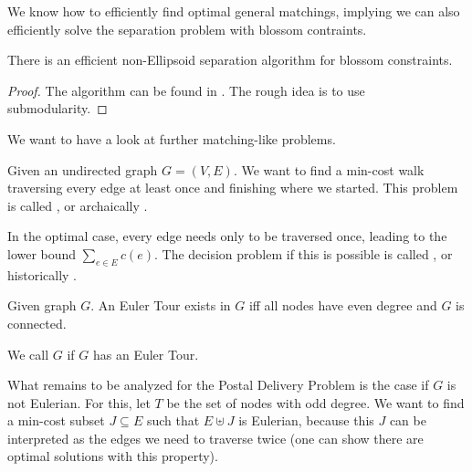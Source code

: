 
We know how to efficiently find optimal general matchings, implying we can also efficiently solve the separation problem
with blossom contraints.
\begin{theorem}
    There is an efficient non-Ellipsoid separation algorithm for blossom constraints.
\end{theorem}
\begin{proof}
    The algorithm can be found in \cite[Ch.~6.8]{comb-optimization-cook}. The rough idea is to use submodularity.
\end{proof}
We want to have a look at further matching-like problems.
\begin{definition}
    Given an undirected graph $G=(V,E)$. We want to find a min-cost walk traversing every edge at least once and finishing where we started.
    This problem is called , or archaically .
\end{definition}
\begin{remark}
    In the optimal case, every edge needs only to be traversed once, leading to the lower bound $\sum_{e\in E} c(e)$.
    The decision problem if this is possible is called , or historically .
\end{remark}
\begin{fact}
    Given graph $G$. An Euler Tour exists in $G$ iff all nodes have even degree and $G$ is connected.
\end{fact}
\begin{definition}
    We call $G$  if $G$ has an Euler Tour.
\end{definition}
What remains to be analyzed for the Postal Delivery Problem is the case if $G$ is not Eulerian.
For this, let $T$ be the set of nodes with odd degree.
We want to find a min-cost subset $J \subseteq E$ such that $E \uplus J$ is Eulerian,
because this $J$ can be interpreted as the edges we need to traverse twice (one can show there are optimal solutions with this property).

